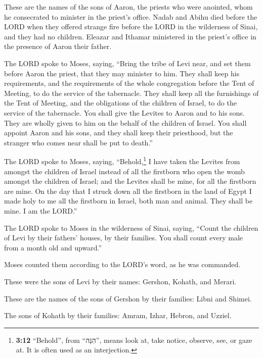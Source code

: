  These are the names of the sons of Aaron, the priests who
were anointed, whom he consecrated to minister in the priest's office.
 Nadab and Abihu died before the LORD when they offered
strange fire before the LORD in the wilderness of Sinai, and they had no
children. Eleazar and Ithamar ministered in the priest's office in the
presence of Aaron their father.

 The LORD spoke to Moses, saying,  ``Bring
the tribe of Levi near, and set them before Aaron the priest, that they
may minister to him.  They shall keep his requirements,
and the requirements of the whole congregation before the Tent of
Meeting, to do the service of the tabernacle.  They shall
keep all the furnishings of the Tent of Meeting, and the obligations of
the children of Israel, to do the service of the tabernacle.
 You shall give the Levites to Aaron and to his sons. They
are wholly given to him on the behalf of the children of Israel.
 You shall appoint Aaron and his sons, and they shall
keep their priesthood, but the stranger who comes near shall be put to
death.''

 The LORD spoke to Moses, saying, 
``Behold,\footnote{\textbf{3:12} ``Behold'', from ``הִנֵּה'', means look
  at, take notice, observe, see, or gaze at. It is often used as an
  interjection.} I have taken the Levites from amongst the children of
Israel instead of all the firstborn who open the womb amongst the
children of Israel; and the Levites shall be mine,  for
all the firstborn are mine. On the day that I struck down all the
firstborn in the land of Egypt I made holy to me all the firstborn in
Israel, both man and animal. They shall be mine. I am the LORD.''

 The LORD spoke to Moses in the wilderness of Sinai,
saying,  ``Count the children of Levi by their fathers'
houses, by their families. You shall count every male from a month old
and upward.''

 Moses counted them according to the LORD's word, as he
was commanded.

 These were the sons of Levi by their names: Gershon,
Kohath, and Merari.

 These are the names of the sons of Gershon by their
families: Libni and Shimei.

 The sons of Kohath by their families: Amram, Izhar,
Hebron, and Uzziel.

